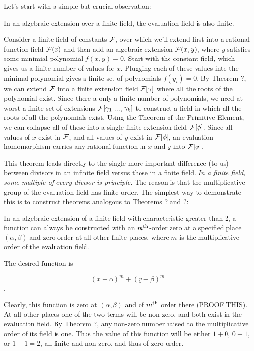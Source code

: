 Let's start with a simple but crucial observation:

\theorem

In an algebraic extension over a finite field, the evaluation field is
also finite.

\proof

Consider a finite field of constants ${\cal F}$, over which we'll
extend first into a rational function field ${\cal F}(x)$ and then add
an algebraic extension ${\cal F}(x,y)$, where $y$ satisfies some
minimial polynomial $f(x,y)=0$.  Start with the constant field, which
gives us a finite number of values for $x$.  Plugging each of these
values into the minimal polynomial gives a finite set of polynomials
$f(y_i)=0$.  By Theorem ?, we can extend ${\cal F}$ into a finite
extension field ${\cal F}[\gamma]$ where all the roots of the
polynomial exist.  Since there a only a finite number of polynomials,
we need at worst a finite set of extensions ${\cal
F}[\gamma_1,...,\gamma_k]$ to construct a field in which all the roots
of all the polynomials exist.  Using the Theorem of the Primitive
Element, we can collapse all of these into a single finite extension
field ${\cal F}[\phi]$.  Since all values of $x$ exist in ${\cal F}$,
and all values of $y$ exist in ${\cal F}[\phi]$, an evaluation
homomorphism carries any rational function in $x$ and $y$ into
${\cal F}[\phi]$.

\endtheorem

This theorem leads directly to the single more important difference
(to us) between divisors in an infinite field versus those in a finite
field.  {\it In a finite field, some multiple of every divisor is
principle.}  The reason is that the multiplicative group of the
evaluation field has finite order.  The simplest way to demonstrate
this is to construct theorems analogous to Theorems ? and ?:

\theorem

In an algebraic extension of a finite field with characteristic
greater than 2, a function can always be constructed with an $m^{\rm
th}$-order zero at a specified place $(\alpha, \beta)$ and zero order
at all other finite places, where $m$ is the multiplicative order of
the evaluation field.

\proof

The desired function is

$$(x-\alpha)^m + (y-\beta)^m$$.

Clearly, this function is zero at $(\alpha, \beta)$ and of $m^{\rm
th}$ order there (PROOF THIS).  At all other places one of the two
terms will be non-zero, and both exist in the evaluation field.  By
Theorem ?, any non-zero number raised to the multiplicative order of
its field is one.  Thus the value of this function will be either
$1+0$, $0+1$, or $1+1=2$, all finite and non-zero, and thus of zero
order.

